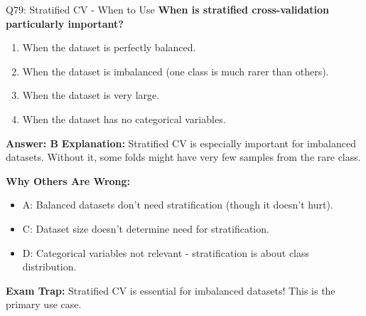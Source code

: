 \documentclass[8pt]{beamer}
\begin{document}
	\begin{frame}{Q79: Stratified CV - When to Use}
		\fontsize{6.5}{7.5}\selectfont
		\textbf{When is stratified cross-validation particularly important?}
		
		\begin{enumerate}
			\item When the dataset is perfectly balanced.
			\item When the dataset is imbalanced (one class is much rarer than others).
			\item When the dataset is very large.
			\item When the dataset has no categorical variables.
		\end{enumerate}
		
		\vspace{0.05cm}
		\textcolor{myblue}{\textbf{Answer: B}}
		\vspace{0.05cm}
		\textcolor{myblue}{\textbf{Explanation:}} Stratified CV is especially important for imbalanced datasets. Without it, some folds might have very few samples from the rare class.
		
		\vspace{0.05cm}
		\textcolor{myred}{\textbf{Why Others Are Wrong:}}
		\begin{itemize}
			\item \textcolor{myred}{A:} Balanced datasets don't need stratification (though it doesn't hurt).
			\item \textcolor{myred}{C:} Dataset size doesn't determine need for stratification.
			\item \textcolor{myred}{D:} Categorical variables not relevant - stratification is about class distribution.
		\end{itemize}
		
		\textcolor{myred}{\textbf{Exam Trap:}} Stratified CV is essential for \textcolor{myblue}{imbalanced datasets}! This is the primary use case.
	\end{frame}
	
\end{document}
